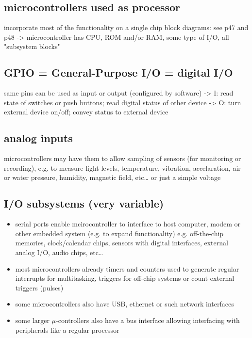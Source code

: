 \documentclass[11pt]{article}
\begin{document}
\subsection{microcontrollers used as processor}
\label{sec:org3f703a9}
incorporate most of the functionality on a single chip
block diagrams: see p47 and p48
-> microcontroller has CPU, ROM and/or RAM, some type of I/O, all "subsystem blocks"
\subsection{GPIO = General-Purpose I/O = digital I/O}
\label{sec:org9ffeccf}
same pins can be used as input or output (configured by software)
-> I: read state of switches or push buttons; read digital status of other device
-> O: turn external device on/off; convey status to external device
\subsection{analog inputs}
\label{sec:org465ee66}
microcontrollers may have them to allow sampling of sensors (for monitoring
or recording), e.g. to measure light levels, temperature, vibration,
accelaration, air or water pressure, humidity, magnetic field, etc\ldots{}
or just a simple voltage
\subsection{I/O subsystems (very variable)}
\label{sec:org61d0cd8}
\begin{itemize}
\item serial ports enable mcirocontroller to interface to host computer, modem or
other embedded system (e.g. to expand functionality) e.g. off-the-chip
memories, clock/calendar chips, sensors with digital interfaces, external
analog I/O, audio chips, etc\ldots{}
\item most microcontrollers already timers and counters used to generate regular
interrupts for multitasking, triggers for off-chip systems or count
external triggers (pulses)
\item some microcontrollers also have USB, ethernet or such network interfaces
\item some larger \(\mu\)-controllers also have a bus interface allowing
interfacing with peripherals like a regular processor
\end{itemize}
\end{document}
